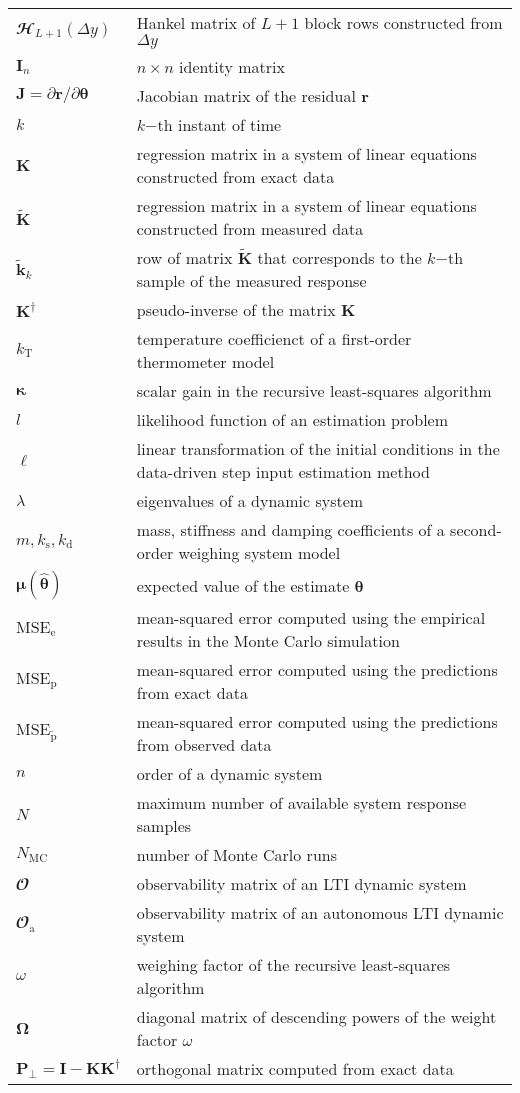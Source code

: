 \begin{longtable}[c]{>{\raggedleft}p{}>{\raggedright}p{}}
$\mathbfcal{H}_{L+1}(\Delta {y})$  &  Hankel matrix of $L+1$ block rows constructed from $\Delta {y}$  \tabularnewline
$\mathbf{I}_n$  & $n \times n$ identity matrix   \tabularnewline
$\mathbf{J} = \partial \mathbf{r} / \partial \bm{\theta}$  &  Jacobian matrix of the residual $\mathbf{r}$   \tabularnewline
$k$  &  $k\mathrm{-th}$ instant of time  \tabularnewline
$\mathbf{K}$  &  regression matrix in a system of linear equations constructed from exact data  \tabularnewline
$\widetilde{\mathbf{K}}$  &  regression matrix in a system of linear equations constructed from measured data  \tabularnewline
$\widetilde{\mathbf{k}}_{k}$  &  row of matrix $\widetilde{\mathbf{K}}$ that corresponds to the $k\mathrm{-th}$ sample of the measured response  \tabularnewline
$\mathbf{K}^\dagger$  &  pseudo-inverse of the matrix $\mathbf{K}$  \tabularnewline
$k_{\mathrm{T}}$  &   temperature coefficienct of a first-order thermometer model  \tabularnewline
$\bm{\kappa}$  &  scalar gain in the recursive least-squares algorithm  \tabularnewline
$l$  &  likelihood function of an estimation problem  \tabularnewline
$\bm{\ell}$  &   linear transformation of the initial conditions in the data-driven step input estimation method  \tabularnewline
$\lambda$  &  eigenvalues of a dynamic system  \tabularnewline
$m, k_{\mathrm{s}}, k_{\mathrm{d}}$  &  mass, stiffness and damping coefficients of a second-order weighing system model  \tabularnewline
$\bm{\mu}\left(\widehat{\bm{\theta}} \right)$  &  expected value of the estimate $\bm{\theta}$  \tabularnewline
$\mathrm{MSE}_{\mathrm{e}}$  &  mean-squared error computed using the empirical results in the Monte Carlo simulation  \tabularnewline
$\mathrm{MSE}_{\mathrm{p}}$  &  mean-squared error computed using the predictions from exact data  \tabularnewline
$\mathrm{MSE}_{\widetilde{\mathrm{p}}}$  &  mean-squared error computed using the predictions from observed data  \tabularnewline
$n$  &  order of a dynamic system  \tabularnewline
$N$  &  maximum number of available system response samples   \tabularnewline
$N_{\mathrm{MC}}$  &  number of Monte Carlo runs   \tabularnewline
$\mathbfcal{O}$  &  observability matrix of an LTI dynamic system  \tabularnewline
$\mathbfcal{O}_\text{a}$  &  observability matrix of an autonomous LTI dynamic system  \tabularnewline
$\omega$   &  weighing factor of the recursive least-squares algorithm  \tabularnewline
$\bm{\Omega}$   &  diagonal matrix of descending powers of the weight factor $\omega$  \tabularnewline
$\mathbf{P}_\perp = \mathbf{I} - \mathbf{K} \mathbf{K}^\dagger$  &  orthogonal matrix computed from exact data  \tabularnewline

\end{longtable}
